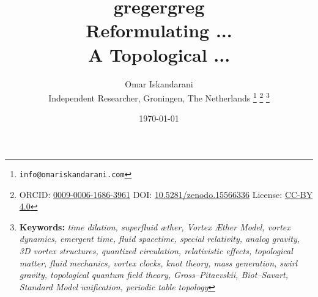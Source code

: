 \documentclass[a4paper,12pt]{article}
\begin{document}
    \author{
        Omar Iskandarani\\
        \small Independent Researcher, Groningen, The Netherlands
        \thanks{\texttt{info@omariskandarani.com}}
        \thanks{ORCID: \href{https://orcid.org/0009-0006-1686-3961}{0009-0006-1686-3961} \quad DOI: \href{https://doi.org/10.5281/zenodo.15566336}{10.5281/zenodo.15566336} \quad License: \href{https://creativecommons.org/licenses/by/4.0/}{CC-BY 4.0}}
        \noindent\thanks{\textbf{Keywords:} \textit{time dilation, superfluid æther, Vortex Æther Model, vortex dynamics, emergent time, fluid spacetime, special relativity, analog gravity, 3D vortex structures, quantized circulation, relativistic effects, topological matter, fluid mechanics, vortex clocks, knot theory, mass generation, swirl gravity, topological quantum field theory, Gross--Pitaevskii, Biot--Savart, Standard Model unification, periodic table topology}}
    }

    \title{
        \textbf{gregergreg}\\[0.5em]
        \large Reformulating ... \\
        \normalsize A Topological ...
    }
    \date{\today}
\end{document}
